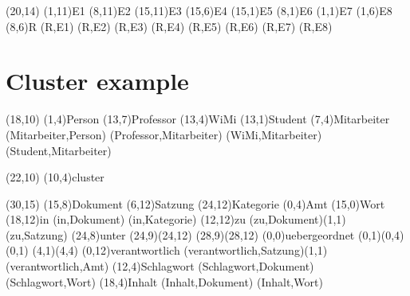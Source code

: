 \documentclass[a4paper,11pt]{article}
\begin{document}
\begin{schema}(20,14)
  \entity(1,11){E1}
  \entity(8,11){E2}
  \entity(15,11){E3}
  \entity(15,6){E4}
  \entity(15,1){E5}
  \entity(8,1){E6}
  \entity(1,1){E7}
  \entity(1,6){E8}
  \relation(8,6){R}
  \connection(R,E1){}
  \connection(R,E2){}
  \connection(R,E3){}
  \connection(R,E4){}
  \connection(R,E5){}
  \connection(R,E6){}
  \connection(R,E7){}
  \connection(R,E8){}
\end{schema}

\section{Cluster example}

\begin{schema}(18,10)
  \entity(1,4){Person}
  \relation(13,7){Professor}
  \relation(13,4){WiMi}
  \relation(13,1){Student}
  \cluster(7,4){Mitarbeiter}
  \connection(Mitarbeiter,Person){}
  \connection(Professor,Mitarbeiter){}
  \connection(WiMi,Mitarbeiter){}
  \connection(Student,Mitarbeiter){}
\end{schema}

\begin{schema}(22,10)
  \cluster(10,4){cluster}
\end{schema}

\setlength{\hermunit}{.5cm}
\begin{schema}(30,15)
\entity(15,8){Dokument}
%
\entity(6,12){Satzung}
%
\entity(24,12){Kategorie}
%
\entity(0,4){Amt}
%
\entity(15,0){Wort}
%
\relation(18,12){in}
\connection(in,Dokument){}
\connection(in,Kategorie){}
%
\relation(12,12){zu}
\connection(zu,Dokument){(1,1)}
\connection(zu,Satzung){}
%
\relation(24,8){unter}
\connection*(24,9)(24,12){}
\connection*(28,9)(28,12){}
%
\relation(0,0){uebergeordnet}
\connection*(0,1)(0,4){(0,1)}
\connection*(4,1)(4,4){}
%
\relation(0,12){verantwortlich}
\connection(verantwortlich,Satzung){(1,1)}
\connection(verantwortlich,Amt){}
%
\relation(12,4){Schlagwort}
\connection(Schlagwort,Dokument){}
\connection(Schlagwort,Wort){}
%
\relation(18,4){Inhalt}
\connection(Inhalt,Dokument){}
\connection(Inhalt,Wort){}
\end{schema}
\end{document}
